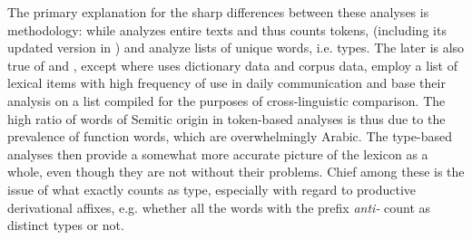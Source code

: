 \documentclass[output=paper]{langsci/langscibook}
\begin{document}
The primary explanation for the sharp differences between these analyses is methodology: while \cite{fenech1978} analyzes entire texts and thus counts tokens, \cite{brincat1996} (including its updated version in \citealt{brincat2011}) and \cite{bovingdondalli2006} analyze lists of unique words, i.e. types. The later is also true of \cite{mifsudborg1997} and \cite{comriespagnol2016}, except where \cite{brincat1996} uses dictionary data and \cite{bovingdondalli2006} corpus data, \cite{mifsudborg1997} employ a list of lexical items with high frequency of use in daily communication and \cite{comriespagnol2016} base their analysis on a list compiled for the purposes of cross-linguistic comparison. The high ratio of words of Semitic origin in token-based analyses is thus due to the prevalence of function words, which are overwhelmingly Arabic. The type-based analyses then provide a somewhat more accurate picture of the lexicon as a whole, even though they are not without their problems. Chief among these is the issue of what exactly counts as type, especially with regard to productive derivational affixes, e.g. whether all the words with the prefix \textit{anti-} count as distinct types or not. 
\end{document}
